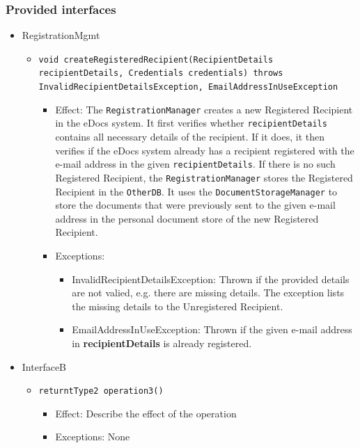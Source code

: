 \documentclass[a4paper,10pt]{article}
\begin{document}
\subsubsection*{Provided interfaces}
\begin{itemize}
    \item RegistrationMgmt
    \begin{itemize}
        \item \texttt{void  createRegisteredRecipient(RecipientDetails recipientDetails, Credentials credentials) throws InvalidRecipientDetailsException, EmailAddressInUseException}
        \begin{itemize}
            \item Effect: The \texttt{RegistrationManager} creates a new Registered Recipient in the eDocs system. It first verifies whether \texttt{recipientDetails} contains all necessary details of the recipient. If it does, it then verifies if the eDocs system already has a recipient registered with the e-mail address in the given \texttt{recipientDetails}. If there is no such Registered Recipient, the \texttt{RegistrationManager} stores the Registered Recipient in the \texttt{OtherDB}. It uses the \texttt{DocumentStorageManager} to store the documents that were previously sent to the given e-mail address in the personal document store of the new Registered Recipient.
            \item Exceptions:
            \begin{itemize}
                	\item InvalidRecipientDetailsException: Thrown if the provided details are not valied, e.g. there are missing details. The exception lists the missing details to the Unregistered Recipient.
                	\item EmailAddressInUseException: Thrown if the given e-mail address in \textbf{recipientDetails} is already registered.
            \end{itemize}
        \end{itemize}
    \end{itemize}

    \item InterfaceB
    \begin{itemize}
        \item \texttt{returntType2 operation3()}
        \begin{itemize}
            \item Effect: Describe the effect of the operation
            \item Exceptions: None
        \end{itemize}
    \end{itemize}
\end{itemize}
\end{document}
